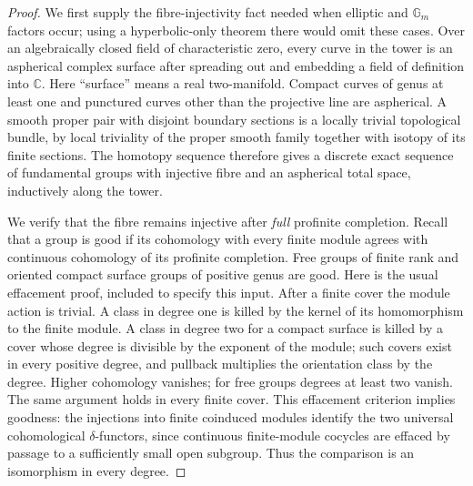 \begin{proof}
We first supply the fibre-injectivity fact needed when elliptic and
$\mathbb G_m$ factors occur; using a hyperbolic-only theorem there
would omit these cases.  Over an algebraically closed field of
characteristic zero, every curve in the tower is an aspherical
complex surface after spreading out and embedding a field of
definition into $\mathbb C$.  Here ``surface'' means a real
two-manifold.  Compact curves of genus at least one and punctured
curves other than the projective line are aspherical.  A smooth proper
pair with disjoint boundary sections is a locally trivial topological
bundle, by local triviality of the proper smooth family together with
isotopy of its finite sections.  The homotopy sequence therefore gives
a discrete exact sequence of fundamental groups with injective fibre
and an aspherical total space, inductively along the tower.

We verify that the fibre remains injective after \emph{full}
profinite completion.  Recall that a group is good if its cohomology
with every finite module agrees with continuous cohomology of its
profinite completion.  Free groups of finite rank and oriented compact
surface groups of positive genus are good.  Here is the usual
effacement proof, included to specify this input.  After a finite
cover the module action is trivial.  A class in degree one is killed
by the kernel of its homomorphism to the finite module.  A class in
degree two for a compact surface is killed by a cover whose degree is
divisible by the exponent of the module; such covers exist in every
positive degree, and pullback multiplies the orientation class by the
degree.  Higher cohomology vanishes; for free groups degrees at least
two vanish.  The same argument holds in every finite cover.  This
effacement criterion implies goodness: the injections into finite
coinduced modules identify the two universal cohomological
$\delta$-functors, since continuous finite-module cocycles are
effaced by passage to a sufficiently small open subgroup.  Thus the
comparison is an isomorphism in every degree.


\end{proof}
